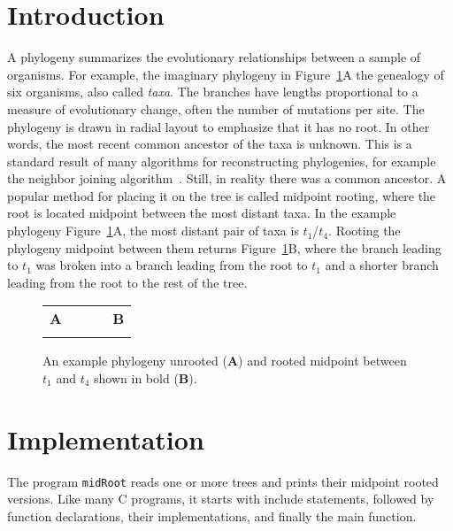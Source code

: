 \nwfilename{}\nwenddocs{}\nwdocspar%
\section{Introduction}
A phylogeny summarizes the evolutionary relationships between a sample
of organisms. For example, the imaginary phylogeny in
Figure~\ref{fig:phy}A the genealogy of six organisms, also called
\emph{taxa}. The branches have lengths proportional to a measure of
evolutionary change, often the number of mutations per site. The
phylogeny is drawn in radial layout to emphasize that it has no
root. In other words, the most recent common ancestor of the taxa is
unknown. This is a standard result of many algorithms for
reconstructing phylogenies, for example the neighbor joining
algorithm~\cite{sai87:nei}. Still, in reality there was a common
ancestor. A popular method for placing it on the tree is called
midpoint rooting, where the root is located midpoint between the most
distant taxa. In the example phylogeny Figure~\ref{fig:phy}A, the most distant pair of taxa
is $t_1$/$t_4$. Rooting the phylogeny midpoint between them
returns Figure~\ref{fig:phy}B, where the branch leading to $t_1$ was
broken into a branch leading from the root to $t_1$ and a shorter branch
leading from the root to the rest of the tree.

\begin{figure}[ht]
  \begin{center}
    \begin{tabular}{ccc}
        \textbf{A} & \textcolor{white}{xxx}& \textbf{B}\\
         & & 
    \end{tabular}
  \end{center}
  \caption{An example phylogeny unrooted (\textbf{A}) and rooted
    midpoint between $t_1$ and $t_4$ shown in bold (\textbf{B}).}\label{fig:phy}
\end{figure}

\section{Implementation}
The program \texttt{midRoot} reads one or more trees and prints their
midpoint rooted versions. Like many C programs, it starts with include
statements, followed by function declarations, their implementations,
and finally the main function.

